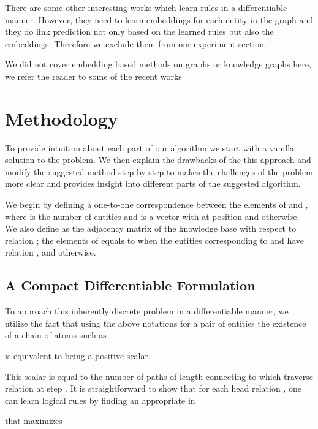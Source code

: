 \documentclass{article}
\begin{document}
There are some other interesting works \citep{das2017go, evans2018learning, minervini2018towards, rocktaschel2017end} which learn rules in a differentiable manner. However, they need to learn embeddings for each entity in the graph and they do link prediction not only based on the learned rules but also the embeddings. Therefore we exclude them from our experiment section. 

We did not cover embedding based methods on graphs or knowledge graphs here, we refer the reader to some of the recent works~\cite{hajiramezanali2019variational,hasanzadeh2019semi,kazemi2019relational,goyal2018graph} 

\section{Methodology}
\label{sec:methodology}

To provide intuition about each part of our algorithm we start with a vanilla solution to the problem. We then explain the drawbacks of the this approach and modify the suggested method step-by-step to makes the challenges of the problem more clear and provides insight into different parts of the suggested algorithm.

We begin by defining a one-to-one correspondence between the elements of  and , where  is the number of entities and  is a vector with  at position  and  otherwise.  We also define  as the adjacency matrix of the knowledge base with respect to relation ; the  elements of   equals to  when the entities corresponding to  and  have relation , and  otherwise.

\subsection{A Compact Differentiable Formulation}
\label{sec:compact_formulation}

To approach this inherently discrete problem in a differentiable manner, we utilize the fact that using the above notations for a pair of entities  the existence of a chain of atoms such as


is equivalent to  being a positive scalar.

This scalar is equal to the number of paths of length  connecting  to  which traverse relation  at step . It is straightforward to show that for each head relation , one can learn logical rules by finding an appropriate  in

that maximizes
\end{document}
